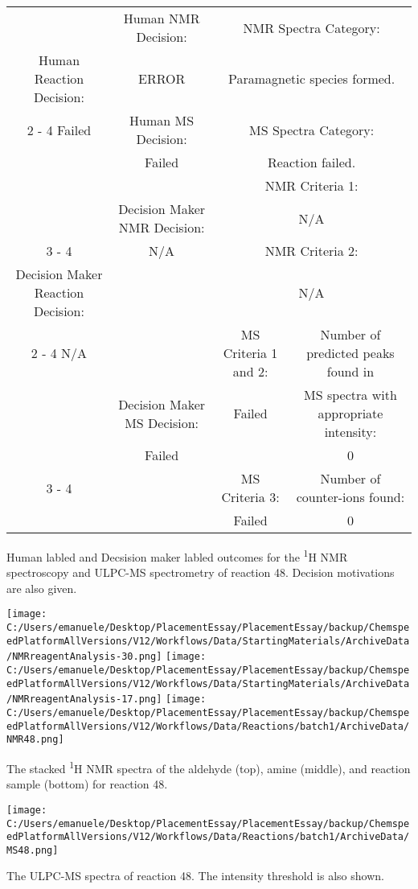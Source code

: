 \documentclass{article}%
\begin{document}
\begin{Decision Table}[H]%
\begin{tabular}{|c|c|c|c|}%
\hline%
&Human NMR Decision:&\multicolumn{2}{|c|}{NMR Spectra Category:}\\%
Human Reaction Decision:&ERROR&\multicolumn{2}{|c|}{Paramagnetic species formed.}\\%
\cline{2%
-%
4}%
Failed&Human MS Decision:&\multicolumn{2}{|c|}{MS Spectra Category:}\\%
&Failed&\multicolumn{2}{|c|}{Reaction failed.}\\%
\hline%
&&\multicolumn{2}{|c|}{NMR Criteria 1:}\\%
&Decision Maker NMR Decision:&\multicolumn{2}{|c|}{N/A}\\%
\cline{3%
-%
4}%
&N/A&\multicolumn{2}{|c|}{NMR Criteria 2:}\\%
Decision Maker Reaction Decision:&&\multicolumn{2}{|c|}{N/A}\\%
\cline{2%
-%
4}%
N/A&&MS Criteria 1 and 2:&Number of predicted peaks found in\\%
&Decision Maker MS Decision:&Failed&MS spectra with appropriate intensity:\\%
&Failed&&0\\%
\cline{3%
-%
4}%
&&MS Criteria 3:&Number of counter{-}ions found:\\%
&&Failed&0\\%
\hline%
\end{tabular}%
\caption{Human labled and Decsision maker labled outcomes for the \textsuperscript{1}H NMR spectroscopy and ULPC-MS spectrometry of reaction 48. Decision motivations are also given.}%
\end{Decision Table}%
\begin{NMR Spectra}[H]%
\begin{center}%
\texttt{[image: C:/Users/emanuele/Desktop/PlacementEssay/PlacementEssay/backup/ChemspeedPlatformAllVersions/V12/Workflows/Data/StartingMaterials/ArchiveData/NMRreagentAnalysis-30.png]}\hfill%
\texttt{[image: C:/Users/emanuele/Desktop/PlacementEssay/PlacementEssay/backup/ChemspeedPlatformAllVersions/V12/Workflows/Data/StartingMaterials/ArchiveData/NMRreagentAnalysis-17.png]}\hfill%
\texttt{[image: C:/Users/emanuele/Desktop/PlacementEssay/PlacementEssay/backup/ChemspeedPlatformAllVersions/V12/Workflows/Data/Reactions/batch1/ArchiveData/NMR48.png]}\hfill%
\end{center}%
\caption{The stacked \textsuperscript{1}H NMR spectra of the aldehyde (top), amine (middle), and reaction sample (bottom) for reaction 48.}%
\end{NMR Spectra}%
\begin{MS Spectra}[H]%
\begin{center}%
\texttt{[image: C:/Users/emanuele/Desktop/PlacementEssay/PlacementEssay/backup/ChemspeedPlatformAllVersions/V12/Workflows/Data/Reactions/batch1/ArchiveData/MS48.png]}\hfill%
\end{center}%
\caption{The ULPC-MS spectra of reaction 48. The intensity threshold is also shown.}%
\end{MS Spectra}%
\end{document}
